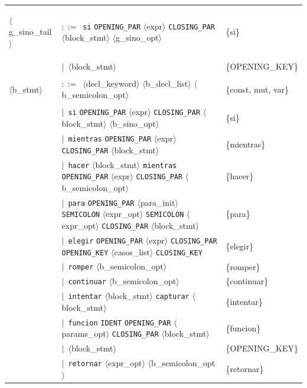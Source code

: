 \documentclass[10pt]{article}
\begin{document}
{\begin{longtable}{@{} p{2.0cm} p{6.9cm} p{6.9cm} @{}}
  \midrule
  \textcolor{ntcolor}{\parbox[t]{1.8cm}{\raggedright$\langle$g\_\allowbreak{}sino\_\allowbreak{}tail$\rangle$}} & $::=$~\texttt{si} \texttt{OPENING\_PAR} $\langle$expr$\rangle$ \texttt{CLOSING\_PAR} $\langle$block\_stmt$\rangle$ $\langle$g\_sino\_opt$\rangle$ & \{si\} \\
   & $\mid$~$\langle$block\_stmt$\rangle$ & \{OPENING\_KEY\} \\
  \midrule
  \textcolor{ntcolor}{\parbox[t]{1.8cm}{\raggedright$\langle$b\_\allowbreak{}stmt$\rangle$}} & $::=$~$\langle$decl\_keyword$\rangle$ $\langle$b\_decl\_list$\rangle$ $\langle$b\_semicolon\_opt$\rangle$ & \{const, mut, var\} \\
   & $\mid$~\texttt{si} \texttt{OPENING\_PAR} $\langle$expr$\rangle$ \texttt{CLOSING\_PAR} $\langle$block\_stmt$\rangle$ $\langle$b\_sino\_opt$\rangle$ & \{si\} \\
   & $\mid$~\texttt{mientras} \texttt{OPENING\_PAR} $\langle$expr$\rangle$ \texttt{CLOSING\_PAR} $\langle$block\_stmt$\rangle$ & \{mientras\} \\
   & $\mid$~\texttt{hacer} $\langle$block\_stmt$\rangle$ \texttt{mientras} \texttt{OPENING\_PAR} $\langle$expr$\rangle$ \texttt{CLOSING\_PAR} $\langle$b\_semicolon\_opt$\rangle$ & \{hacer\} \\
   & $\mid$~\texttt{para} \texttt{OPENING\_PAR} $\langle$para\_init$\rangle$ \texttt{SEMICOLON} $\langle$expr\_opt$\rangle$ \texttt{SEMICOLON} $\langle$expr\_opt$\rangle$ \texttt{CLOSING\_PAR} $\langle$block\_stmt$\rangle$ & \{para\} \\
   & $\mid$~\texttt{elegir} \texttt{OPENING\_PAR} $\langle$expr$\rangle$ \texttt{CLOSING\_PAR} \texttt{OPENING\_KEY} $\langle$casos\_list$\rangle$ \texttt{CLOSING\_KEY} & \{elegir\} \\
   & $\mid$~\texttt{romper} $\langle$b\_semicolon\_opt$\rangle$ & \{romper\} \\
   & $\mid$~\texttt{continuar} $\langle$b\_semicolon\_opt$\rangle$ & \{continuar\} \\
   & $\mid$~\texttt{intentar} $\langle$block\_stmt$\rangle$ \texttt{capturar} $\langle$block\_stmt$\rangle$ & \{intentar\} \\
   & $\mid$~\texttt{funcion} \texttt{IDENT} \texttt{OPENING\_PAR} $\langle$params\_opt$\rangle$ \texttt{CLOSING\_PAR} $\langle$block\_stmt$\rangle$ & \{funcion\} \\
   & $\mid$~$\langle$block\_stmt$\rangle$ & \{OPENING\_KEY\} \\
   & $\mid$~\texttt{retornar} $\langle$expr\_opt$\rangle$ $\langle$b\_semicolon\_opt$\rangle$ & \{retornar\} \\

\end{longtable}}
\end{document}
